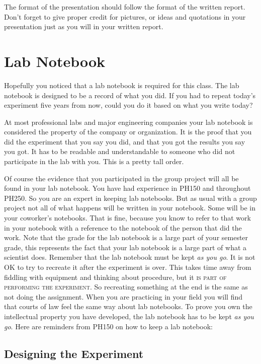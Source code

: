 The format of the presentation should follow the format of the written report. Don't forget to give proper credit for pictures, or ideas and quotations in your presentation just as you will in your written report.

\section{Lab Notebook}

Hopefully you noticed that a lab notebook is required for this class. The
lab notebook is designed to be a record of what you did. If you had to repeat today's experiment five years from now, could you do it based on what you write today?

At most professional labs and major engineering companies your lab notebook is considered the property of the company or organization. It is the proof that you did the experiment that you say you did, and that you got the results you say you got. It has to be readable and understandable to someone who did not participate in the lab with you. This is a pretty tall order.

Of course the evidence that you participated in the group project will all
be found in your lab notebook. You have had experience in PH150 and throughout PH250. So you are an expert in keeping lab notebooks. But as usual with a group project not all of what happens will be written in your notebook. Some will be in your coworker's notebooks. That is fine, because you know to refer to that work in your notebook with a reference to the notebook of the person that did the work. Note that the grade for the lab notebook is a {\Large large} part of your semester grade, this represents the fact that your lab notebook is a {\Large large} part of what a scientist does. Remember that the lab notebook must be kept \emph{as you go}. It is not OK to try to recreate it after the experiment is over. This takes time away from fiddling with equipment and thinking about procedure, but it  \textsc{is part of performing the experiment.} So recreating something at the end is the same as not doing the assignment. When you are practicing in your field you will find that courts of law feel the same way about lab notebooks. To prove you own the intellectual property you have developed, the lab notebook has to be kept \emph{as you go}. Here are reminders from PH150 on how to keep a lab notebook:

\subsection{Designing the Experiment}

